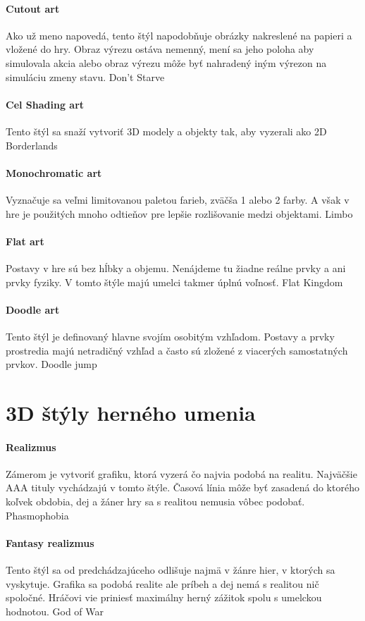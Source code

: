 \documentclass[10pt,twoside,slovak,a4paper]{article}
\begin{document}
\paragraph{Cutout art}
Ako už meno napovedá, tento štýl napodobňuje obrázky nakreslené na papieri a vložené do hry. Obraz výrezu ostáva nemenný, mení sa jeho poloha aby simulovala akcia alebo obraz výrezu môže byť nahradený iným výrezon na simuláciu zmeny stavu.
Don't Starve

\paragraph{Cel Shading art}
Tento štýl sa snaží vytvoriť 3D modely a objekty tak, aby vyzerali ako 2D
Borderlands
\paragraph{Monochromatic art}
Vyznačuje sa veľmi limitovanou paletou farieb, zväčša 1 alebo 2 farby. A však v hre je použitých mnoho odtieňov pre lepšie rozlišovanie medzi objektami.
Limbo
\paragraph{Flat art}
Postavy v hre sú bez hĺbky a objemu. Nenájdeme tu žiadne reálne prvky a ani prvky fyziky. V tomto štýle majú umelci takmer úplnú voľnosť.
Flat Kingdom
\paragraph{Doodle art}
Tento štýl je definovaný hlavne svojím osobitým vzhľadom. Postavy a prvky prostredia majú netradičný vzhľad a často sú zložené z viacerých samostatných prvkov.
Doodle jump


\section{3D štýly herného umenia}

\paragraph{Realizmus}
Zámerom je vytvoriť grafiku, ktorá vyzerá čo najvia podobá na realitu. Najväčšie AAA tituly vychádzajú v tomto štýle. Časová línia môže byť zasadená do ktorého koľvek obdobia, dej a žáner hry sa s realitou nemusia vôbec podobať.
Phasmophobia

\paragraph{Fantasy realizmus}
Tento štýl sa od predchádzajúceho odlišuje najmä v žánre hier, v ktorých sa vyskytuje. Grafika sa podobá realite ale príbeh a dej nemá s realitou nič spoločné. Hráčovi vie priniesť maximálny herný zážitok spolu s umelckou hodnotou.
God of War
\end{document}
